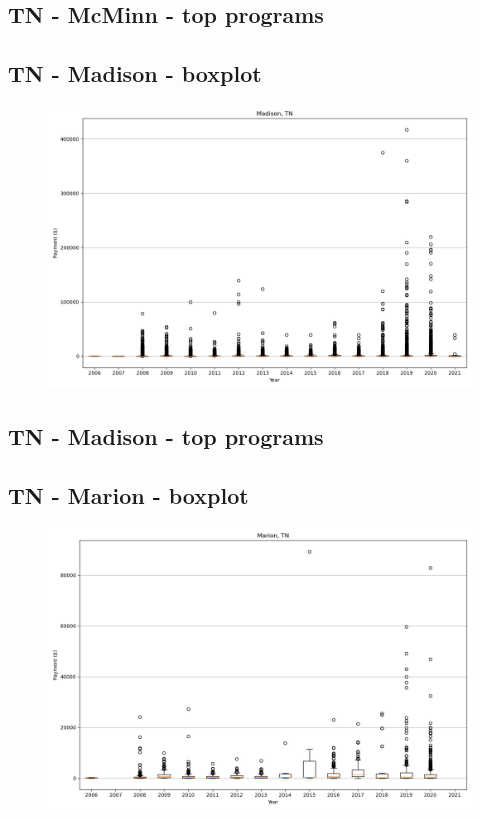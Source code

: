 \subsection*{TN - McMinn - top programs}

\newpage
\subsection*{TN - Madison - boxplot}
\begin{figure}[h]
\centering
\includegraphics[width=7in]{../output/boxplots/counties/Madison-TN_boxplot.png}
\end{figure}


\subsection*{TN - Madison - top programs}

\newpage
\subsection*{TN - Marion - boxplot}
\begin{figure}[h]
\centering
\includegraphics[width=7in]{../output/boxplots/counties/Marion-TN_boxplot.png}
\end{figure}


